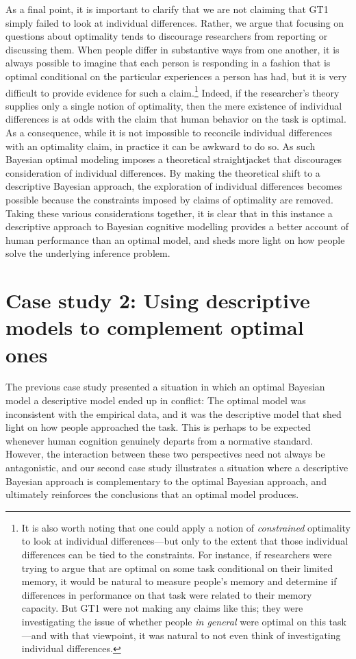 \documentclass[doc,floatsintext]{apa6}
\begin{document}
As a final point, it is important to clarify that we are not claiming that GT1 simply failed to look at individual differences. Rather, we argue that focusing on questions about optimality tends to discourage researchers from reporting or discussing them. When people differ in substantive ways from one another, it is always possible to imagine that each person is responding in a fashion that is optimal conditional on the particular experiences a person has had, but it is very difficult to provide evidence for such a claim.\footnote{It is also worth noting that one could apply a notion of {\it constrained} optimality to look at individual differences---but only to the extent that those individual differences can be tied to the constraints. For instance, if researchers were trying to argue that are optimal on some task conditional on their limited memory, it would be natural to measure people’s memory and determine if differences in performance on that task were related to their memory capacity. But GT1 were not making any claims like this; they were investigating the issue of whether people {\it in general} were optimal on this task---and with that viewpoint, it was natural to not even think of investigating individual differences.} Indeed, if the researcher's theory supplies only a single notion of optimality, then the mere existence of individual differences is at odds with the claim that human behavior on the task is optimal. As a consequence, while it is not impossible to reconcile individual differences with an optimality claim, in practice it can be awkward to do so. As such Bayesian optimal modeling imposes a theoretical straightjacket that discourages consideration of individual differences. By making the theoretical shift to a descriptive Bayesian approach, the exploration of individual differences becomes possible because the constraints imposed by claims of optimality are removed. Taking these various considerations together, it is clear that in this instance a descriptive approach to Bayesian cognitive modelling provides a better account of human performance than an optimal model, and sheds more light on how people solve the underlying inference problem.




\section*{Case study 2: Using descriptive models to complement optimal ones}

The previous case study presented a situation in which an optimal Bayesian model a descriptive model ended up in conflict: The optimal model was inconsistent with the empirical data, and it was the descriptive model that shed light on how people approached the task. This is perhaps to be expected whenever human cognition genuinely departs from a normative standard. However, the interaction between these two perspectives need not always be antagonistic, and our second case study illustrates a situation where a descriptive Bayesian approach is complementary to the optimal Bayesian approach, and ultimately reinforces the conclusions that an optimal model produces.
\end{document}
